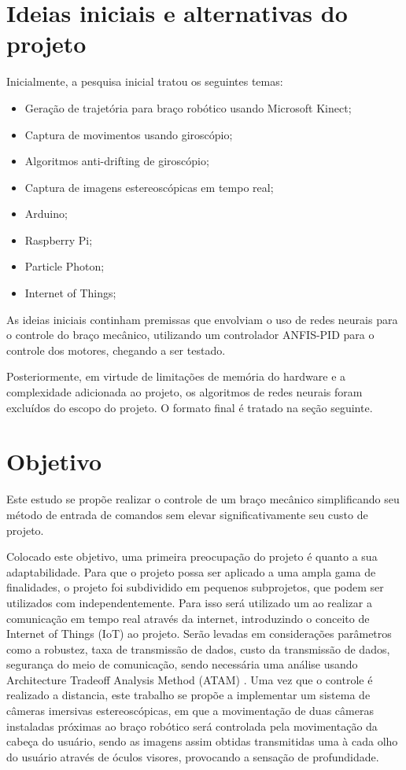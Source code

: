 		\section*{Ideias iniciais e alternativas do projeto}\label{subsec-iniciais}
	
	Inicialmente, a pesquisa inicial tratou os seguintes temas:\par
	
	
	\begin{itemize}[noitemsep]
		\item Geração de trajetória para braço robótico usando Microsoft Kinect;
		\item Captura de movimentos usando giroscópio;
		\item Algoritmos anti-drifting de giroscópio;
		\item Captura de imagens estereoscópicas em tempo real;
		\item Arduino;
		\item Raspberry Pi;
		\item Particle Photon;
		\item Internet of Things;
	\end{itemize}
	As ideias iniciais continham premissas que envolviam o uso de redes neurais para o controle do braço mecânico, utilizando um controlador ANFIS-PID para o controle dos motores, chegando a ser testado.\par
	Posteriormente, em virtude de limitações de memória do hardware e a complexidade adicionada ao projeto, os algoritmos de redes neurais foram excluídos do escopo do projeto.
	O formato final é tratado na seção seguinte.
	\section*{Objetivo}\label{sec-objetivo}

Este estudo se propõe realizar o controle de um braço mecânico simplificando seu método de entrada de comandos sem elevar significativamente seu custo de projeto.\par
Colocado este objetivo, uma primeira preocupação do projeto é quanto a sua adaptabilidade. Para que o projeto possa ser aplicado a uma ampla gama de finalidades, o projeto foi subdividido em pequenos subprojetos, que podem ser utilizados com independentemente. Para isso será utilizado um ao realizar a comunicação em tempo real através da internet, introduzindo o conceito de Internet of  Things (IoT) ao projeto. 
Serão levadas em considerações parâmetros como a robustez, taxa de transmissão de dados, custo da transmissão de dados, segurança do meio de comunicação, sendo necessária uma análise usando Architecture Tradeoff Analysis Method (ATAM) .
Uma vez que o controle é realizado a distancia, este trabalho se propõe a implementar um sistema de câmeras imersivas estereoscópicas, em que a movimentação de duas câmeras instaladas próximas ao braço robótico será controlada pela movimentação da cabeça do usuário, sendo as imagens assim obtidas transmitidas uma à cada olho do usuário através de óculos visores, provocando a sensação de profundidade.